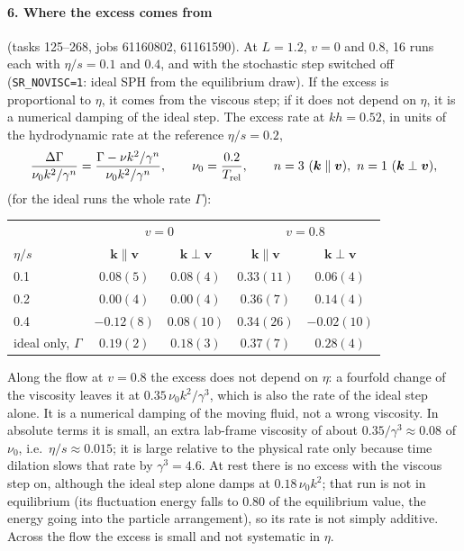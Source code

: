 \documentclass[11pt,aps,preprint,nofootinbib,superscriptaddress,tightenlines]{revtex4-2}
\let\oldparagraph\paragraph
\renewcommand{\paragraph}{\par\bigskip\oldparagraph}
\begin{document}
\paragraph{6. Where the excess comes from} (tasks 125--268, jobs 61160802, 61161590).  At $L=1.2$, $v=0$ and
$0.8$, 16 runs each with $\eta/s=0.1$ and $0.4$, and with the stochastic step switched off
(\texttt{SR\_NOVISC=1}: ideal SPH from the equilibrium draw).  If the excess is proportional to $\eta$, it
comes from the viscous step; if it does not depend on $\eta$, it is a numerical damping of the ideal step.
The excess rate at $kh=0.52$, in units of the hydrodynamic rate at the reference $\eta/s=0.2$,
\begin{equation}
\frac{\Delta\Gamma}{\nu_0k^2/\gamma^n}=\frac{\Gamma-\nu k^2/\gamma^n}{\nu_0k^2/\gamma^n},\qquad \nu_0=\frac{0.2}{T_{\rm rel}},
\qquad n=3\ (\bm k\parallel\bm v),\ n=1\ (\bm k\perp\bm v),
\end{equation}
(for the ideal runs the whole rate $\Gamma$):
\begin{center}
\begin{tabular}{lcccc}
\hline
 & \multicolumn{2}{c}{$v=0$} & \multicolumn{2}{c}{$v=0.8$} \\
$\eta/s$ & $\bm k\parallel\bm v$ & $\bm k\perp\bm v$ & $\bm k\parallel\bm v$ & $\bm k\perp\bm v$ \\ \hline
0.1 & $0.08(5)$ & $0.08(4)$ & $0.33(11)$ & $0.06(4)$ \\
0.2 & $0.00(4)$ & $0.00(4)$ & $0.36(7)$ & $0.14(4)$ \\
0.4 & $-0.12(8)$ & $0.08(10)$ & $0.34(26)$ & $-0.02(10)$ \\
ideal only, $\Gamma$ & $0.19(2)$ & $0.18(3)$ & $0.37(7)$ & $0.28(4)$ \\
\hline
\end{tabular}
\end{center}
Along the flow at $v=0.8$ the excess does not depend on $\eta$: a fourfold change of the viscosity leaves
it at $0.35\,\nu_0k^2/\gamma^3$, which is also the rate of the ideal step alone.  It is a numerical damping
of the moving fluid, not a wrong viscosity.  In absolute terms it is small, an extra lab-frame
viscosity of about $0.35/\gamma^3\approx0.08$ of $\nu_0$, i.e.\ $\eta/s\approx0.015$; it is large relative to the physical
rate only because time dilation slows that rate by $\gamma^3=4.6$.  At rest there is no excess with the
viscous step on, although the ideal step alone damps at $0.18\,\nu_0k^2$; that run is not in equilibrium
(its fluctuation energy falls to $0.80$ of the equilibrium value, the energy going into the particle
arrangement), so its rate is not simply additive.  Across the flow the excess is small and not
systematic in $\eta$.
\end{document}
